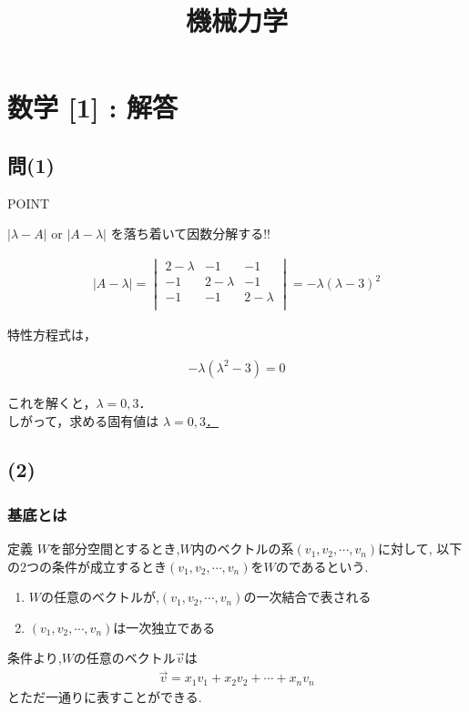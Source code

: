 \documentclass[a4paper]{jsarticle}
\author{}
\title{機械力学}
\date{}
\begin{document}
\section*{数学 [1] : 解答}

\subsection*{問(1)}

\begin{itembox}[l]{POINT}
	\begin{center}
		$|\lambda - A|$ or $|A - \lambda|$ を落ち着いて因数分解する!!
	\end{center}
\end{itembox}

\begin{eqnarray*}
	|A - \lambda|
	=
	\begin{vmatrix}
		2-\lambda & -1        & -1        \\
		-1        & 2-\lambda & -1        \\
		-1        & -1        & 2-\lambda \\
	\end{vmatrix}
	=
	-\lambda(\lambda-3)^2
\end{eqnarray*}

\noindent

特性方程式は，

\begin{eqnarray*}
	-\lambda(\lambda^2 -3) = 0
\end{eqnarray*}

\noindent
これを解くと，$\lambda = 0, 3$．\\
しがって，求める固有値は \underline{$\lambda = 0, 3$．}

\subsection*{(2)}

\subsubsection*{基底とは}

\begin{itembox}[l]{定義}
	$W$を部分空間とするとき,$W$内のベクトルの系$\left(v_1,v_2,\cdots,v_n\right)$に対して,
	以下の2つの条件が成立するとき$\left(v_1,v_2,\cdots,v_n\right)$を$W$のであるという.
	\begin{enumerate}[(1)]
		\item $W$の任意のベクトルが,$\left(v_1,v_2,\cdots,v_n\right)$の一次結合で表される
		\item $\left(v_1,v_2,\cdots,v_n\right)$は一次独立である
	\end{enumerate}
\end{itembox}
条件より,$W$の任意のベクトル$\vec{v}$は
\begin{eqnarray*}
	\vec{v}=x_1v_1+x_2v_2+\cdots+x_nv_n
\end{eqnarray*}
とただ一通りに表すことができる.\\
\end{document}

